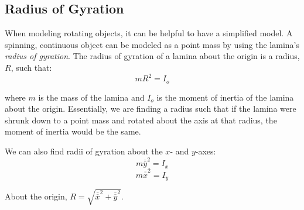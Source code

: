 \subsection{Radius of Gyration}
When modeling rotating objects, it can be helpful to have a simplified model. 
A spinning, continuous object can be modeled as a point mass by using the 
lamina's \textit{radius of gyration}. The radius of 
gyration of a lamina about the origin is a radius, $R$, such that:
$$mR^2 = I_o$$

where $m$ is the mass of the lamina and $I_o$ is the moment of inertia of the 
lamina about the origin. Essentially, we are finding a radius such that if the lamina were 
shrunk down to a point mass and rotated about the axis at that radius, the 
moment of inertia would be the same. 

We can also find radii of gyration about the $x$- and $y$-axes:
$$m \overline{\overline{y}}^2 = I_{x}$$
$$m \overline{\overline{x}}^2 = I_{y}$$

About the origin, $R = \sqrt{ \overline{\overline{x}}^2 + \overline{\overline{y}}^2}$. 


